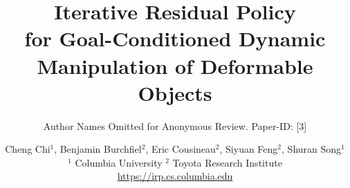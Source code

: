 \documentclass[conference]{IEEEtran}
\begin{document}
\title{ Iterative Residual Policy \\ \LARGE{for Goal-Conditioned Dynamic Manipulation of Deformable Objects}}


\author{Author Names Omitted for Anonymous Review. Paper-ID: [3]} 
\author{Cheng Chi$^1$, Benjamin Burchfiel$^2$, Eric Cousineau$^2$, Siyuan Feng$^2$, Shuran Song$^1$ \\ $^1$ Columbia University \quad\quad\quad  $^2$ Toyota Research Institute
\\ \href{https://irp.cs.columbia.edu}{https://irp.cs.columbia.edu}}
\maketitle
\end{document}
